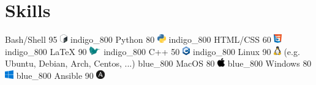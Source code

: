 \documentclass[singlesided,
  paper=a4,
  fontsize=10pt
]{resume}
\begin{document}
{  \section[\nerdfont]{Skills}
      \skill%
        {Bash/Shell}%
        {95}%
        {\includegraphics[height=1em]{skill/bash.png}}%
        {}%
        {indigo_800}
      \skill%
        {Python}%
        {80}%
        {\includegraphics[height=1em]{skill/python.png}}%
        {}%
        {indigo_800}
      \skill%
        {HTML/CSS}%
        {60}%
        {\includegraphics[height=1em]{skill/html_css.png}}%
        {}%
        {indigo_800}
      \skill%
        {LaTeX}%
        {90}%
        {\includegraphics[height=1em]{skill/latex.png}}%
        {}%
        {indigo_800}
      \skill%
        {C++}%
        {50}%
        {\includegraphics[height=1em]{skill/cpp.png}}%
        {}%
        {indigo_800}
      \skill%
        {Linux}%
        {90}%
        {\includegraphics[height=1em]{skill/linux.png}}%
        {(e.g. Ubuntu, Debian, Arch, Centos, ...)}%
        {blue_800}
      \skill%
        {MacOS}%
        {80}%
        {\includegraphics[height=1em]{skill/apple.png}}%
        {}%
        {blue_800}
      \skill%
        {Windows}%
        {80}%
        {\includegraphics[height=1em]{skill/windows.png}}%
        {}%
        {blue_800}
      \skill%
        {Ansible}%
        {90}%
        {\includegraphics[height=1em]{skill/ansible.png}}%
        {}%
}
\end{document}
